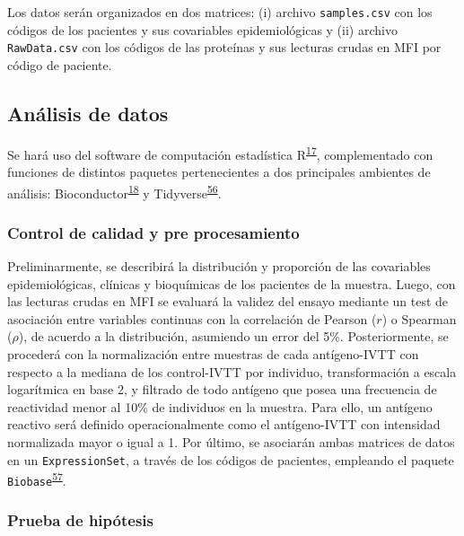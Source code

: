 \documentclass[a4paper]{article}
\begin{document}
Los datos serán organizados en dos matrices: (i) archivo
\texttt{samples.csv} con los códigos de los pacientes y sus covariables
epidemiológicas y (ii) archivo \texttt{RawData.csv} con los códigos de
las proteínas y sus lecturas crudas en MFI por código de paciente.

\hypertarget{anadata}{\subsection{Análisis de datos}\label{anadata}}

Se hará uso del software de computación estadística
R\textsuperscript{\protect\hyperlink{ref-R2016}{17}}, complementado con
funciones de distintos paquetes pertenecientes a dos principales
ambientes de análisis:
Bioconductor\textsuperscript{\protect\hyperlink{ref-bioconductor2004}{18}}
y
Tidyverse\textsuperscript{\protect\hyperlink{ref-wickham2016r4ds}{56}}.

\subsubsection{Control de calidad y pre
procesamiento}\label{control-de-calidad-y-pre-procesamiento}

Preliminarmente, se describirá la distribución y proporción de las
covariables epidemiológicas, clínicas y bioquímicas de los pacientes de
la muestra. Luego, con las lecturas crudas en MFI se evaluará la validez
del ensayo mediante un test de asociación entre variables continuas con
la correlación de Pearson (\(r\)) o Spearman (\(\rho\)), de acuerdo a la
distribución, asumiendo un error del 5\%. Posteriormente, se procederá
con la normalización entre muestras de cada antígeno-IVTT con respecto a
la mediana de los control-IVTT por individuo, transformación a escala
logarítmica en base 2, y filtrado de todo antígeno que posea una
frecuencia de reactividad menor al 10\% de individuos en la muestra.
Para ello, un antígeno reactivo será definido operacionalmente como el
antígeno-IVTT con intensidad normalizada mayor o igual a 1. Por último,
se asociarán ambas matrices de datos en un \texttt{ExpressionSet}, a
través de los códigos de pacientes, empleando el paquete
\texttt{Biobase}\textsuperscript{\protect\hyperlink{ref-Biobase}{57}}.

\subsubsection{Prueba de hipótesis}\label{prueba-de-hipotesis}
\end{document}
